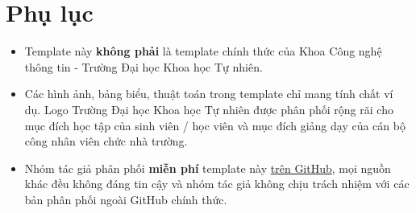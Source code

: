 \section{Phụ lục}
\begin{itemize}
\item Template này \textbf{không phải} là template chính thức của Khoa Công nghệ thông tin - Trường Đại học Khoa học Tự nhiên.
\item Các hình ảnh, bảng biểu, thuật toán trong template chỉ mang tính chất ví dụ. Logo Trường Đại học Khoa học Tự nhiên được phân phối rộng rãi cho mục đích học tập của sinh viên / học viên và mục đích giảng dạy của cán bộ công nhân viên chức nhà trường.
\item Nhóm tác giả phân phối \textbf{miễn phí} template này \href{https://github.com/khongsomeo/latex-products}{trên GitHub}, mọi nguồn khác đều không đáng tin cậy và nhóm tác giả không chịu trách nhiệm với các bản phân phối ngoài GitHub chính thức.
\end{itemize}
